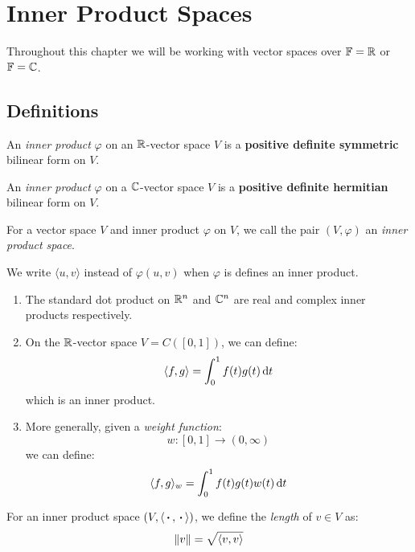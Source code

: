 \documentclass[../main.tex]{subfiles}
\begin{document}
\chapter{Inner Product Spaces}
\begin{remark}[Note]
  Throughout this chapter we will be working with vector spaces over $\mathbb{F} = \mathbb{R}$ or $\mathbb{F} = \mathbb{C}$.
\end{remark}
\section{Definitions}
\begin{definition}
  An \textit{inner product} $\varphi$ on an $\mathbb{R}$-vector space $V$ is a \textbf{positive definite symmetric} bilinear form on $V$.
\end{definition}
\begin{definition}
  An \textit{inner product} $\varphi$ on a $\mathbb{C}$-vector space $V$ is a \textbf{positive definite hermitian} bilinear form on $V$.
\end{definition}
\begin{definition}
  For a vector space $V$ and inner product $\varphi$ on $V$, we call the pair $(V, \varphi)$ an \textit{inner product space}.
\end{definition}
\begin{remark}[Notation]
  We write $\langle u, v \rangle$ instead of $\varphi(u, v)$ when $\varphi$ is defines an inner product.
\end{remark}
\begin{example}
  \begin{enumerate}
    \item The standard dot product on $\mathbb{R}^{n}$ and $\mathbb{C}^{n}$ are real and complex inner products respectively.
    \item On the $\mathbb{R}$-vector space $V = C([0, 1])$, we can define:
      \[
        \langle f, g \rangle = \int_{0}^{1} f(t) g(t) \d{t}
      \]
      which is an inner product.
    \item More generally, given a \textit{weight function}:
      \[
        w: [0, 1] \to (0, \infty)
      \]
      we can define:
      \[
        \langle f, g \rangle_{w} = \int_{0}^{1} f(t) g(t) w(t) \d{t}
      \]
  \end{enumerate}
\end{example}
\begin{definition}[Length]
  For an inner product space $(V, \langle {\hspace{0.18em}\boldsymbol{\cdot}\hspace{0.18em}}, {\hspace{0.18em}\boldsymbol{\cdot}\hspace{0.18em}} \rangle)$, we define the \textit{length} of $v \in V$ as:
  \[
    \left\lVert v \right\rVert = \sqrt{\langle v, v \rangle}
  \]
\end{definition}
\end{document}

